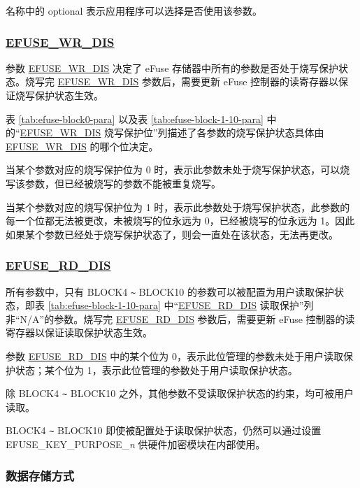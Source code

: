 \documentclass[main\_\_CN.tex]{subfiles}
\begin{document}
名称中的 optional 表示应用程序可以选择是否使用该参数。

\subsubsection{\hyperref[fielddesc:EFUSEWRDIS]{EFUSE\_WR\_DIS}}
\label{sec:efuse-wr-dis}

参数 \hyperref[fielddesc:EFUSEWRDIS]{EFUSE\_WR\_DIS} 决定了 eFuse 存储器中所有的参数是否处于烧写保护状态。烧写完 \hyperref[fielddesc:EFUSEWRDIS]{EFUSE\_WR\_DIS} 参数后，需要更新 eFuse 控制器的读寄存器以保证烧写保护状态生效。

表 \ref{tab:efuse-block0-para} 以及表 \ref{tab:efuse-block-1-10-para} 中的“\hyperref[fielddesc:EFUSEWRDIS]{EFUSE\_WR\_DIS} 烧写保护位”列描述了各参数的烧写保护状态具体由 \hyperref[fielddesc:EFUSEWRDIS]{EFUSE\_WR\_DIS} 的哪个位决定。

当某个参数对应的烧写保护位为 0 时，表示此参数未处于烧写保护状态，可以烧写该参数，但已经被烧写的参数不能被重复烧写。

当某个参数对应的烧写保护位为 1 时，表示此参数处于烧写保护状态，此参数的每一个位都无法被更改，未被烧写的位永远为 0，已经被烧写的位永远为 1。因此如果某个参数已经处于烧写保护状态了，则会一直处在该状态，无法再更改。

\subsubsection{\hyperref[fielddesc:EFUSERDDIS]{EFUSE\_RD\_DIS}}
\label{sec:efuse-rd-dis}

所有参数中，只有 BLOCK4 \verb+~+ BLOCK10 的参数可以被配置为用户读取保护状态，即表 \ref{tab:efuse-block-1-10-para} 中“\hyperref[fielddesc:EFUSERDDIS]{EFUSE\_RD\_DIS} 读取保护”列非“N/A”的参数。烧写完 \hyperref[fielddesc:EFUSERDDIS]{EFUSE\_RD\_DIS} 参数后，需要更新 eFuse 控制器的读寄存器以保证读取保护状态生效。

参数 \hyperref[fielddesc:EFUSERDDIS]{EFUSE\_RD\_DIS} 中的某个位为 0，表示此位管理的参数未处于用户读取保护状态；某个位为 1，表示此位管理的参数处于用户读取保护状态。

除 BLOCK4 \verb+~+ BLOCK10 之外，其他参数不受读取保护状态的约束，均可被用户读取。

BLOCK4 \verb+~+ BLOCK10 即使被配置处于读取保护状态，仍然可以通过设置 EFUSE\_KEY\_PURPOSE\_\textcolor{myred}{\it{n}} 供硬件加密模块在内部使用。

\subsubsection{数据存储方式}
\label{sec:efuse-data-storage}
\end{document}
